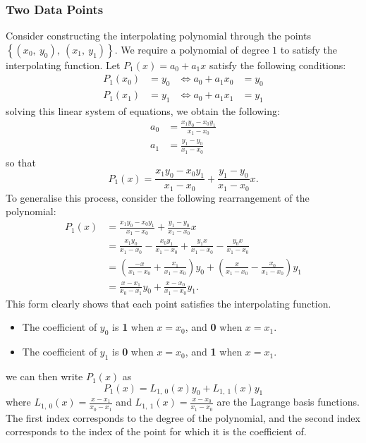 \documentclass{article}
\begin{document}
\subsubsection{Two Data Points}
Consider constructing the interpolating polynomial through the points \(\left\{ \left( x_0,\: y_0 \right),\: \left( x_1,\: y_1 \right) \right\}\).
We require a polynomial of degree \(1\) to satisfy the interpolating function. Let \(P_1\left( x \right) = a_0 + a_1 x\) satisfy the following
conditions:
\begin{align*}
    P_1\left( x_0 \right) & = y_0 & \iff a_0 + a_1 x_0 & = y_0 \\
    P_1\left( x_1 \right) & = y_1 & \iff a_0 + a_1 x_1 & = y_1
\end{align*}
solving this linear system of equations, we obtain the following:
\begin{align*}
    a_0 & = \frac{x_1 y_0 - x_0 y_1}{x_1 - x_0} \\
    a_1 & = \frac{y_1 - y_0}{x_1 - x_0}
\end{align*}
so that
\begin{equation*}
    P_1\left( x \right) = \frac{x_1 y_0 - x_0 y_1}{x_1 - x_0} + \frac{y_1 - y_0}{x_1 - x_0} x.
\end{equation*}
To generalise this process, consider the following rearrangement of the polynomial:
\begin{align*}
    P_1\left( x \right) & = \frac{x_1 y_0 - x_0 y_1}{x_1 - x_0} + \frac{y_1 - y_0}{x_1 - x_0} x                                                              \\
                        & = \frac{x_1 y_0}{x_1 - x_0} - \frac{x_0 y_1}{x_1 - x_0} + \frac{y_1 x}{x_1 - x_0} - \frac{y_0 x}{x_1 - x_0}                        \\
                        & = \left( \frac{-x}{x_1 - x_0} + \frac{x_1}{x_1 - x_0} \right) y_0 + \left( \frac{x}{x_1 - x_0} - \frac{x_0}{x_1 - x_0} \right) y_1 \\
                        & = \frac{x - x_1}{x_0 - x_1} y_0 + \frac{x - x_0}{x_1 - x_0} y_1.
\end{align*}
This form clearly shows that each point satisfies the interpolating function.
\begin{itemize}
    \item The coefficient of \(y_0\) is \textbf{1} when \(x = x_0\), and \textbf{0} when \(x = x_1\).
    \item The coefficient of \(y_1\) is \textbf{0} when \(x = x_0\), and \textbf{1} when \(x = x_1\).
\end{itemize}
we can then write \(P_1\left( x \right)\) as
\begin{equation*}
    P_1\left( x \right) = L_{1,\: 0}\left( x \right) y_0 + L_{1,\: 1}\left( x \right) y_1
\end{equation*}
where \(L_{1,\: 0}\left( x \right) = \frac{x - x_1}{x_0 - x_1}\) and \(L_{1,\: 1}\left( x \right) = \frac{x - x_0}{x_1 - x_0}\)
are the Lagrange basis functions. The first index corresponds to the degree
of the polynomial, and the second index corresponds to the index of the
point for which it is the coefficient of.
\end{document}
